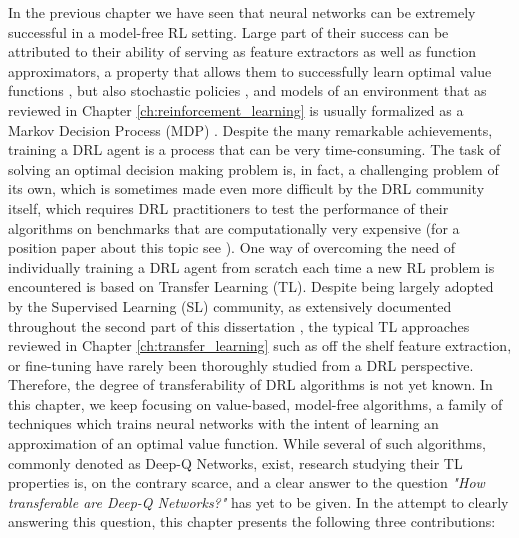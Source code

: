 In the previous chapter we have seen that neural networks can be extremely successful in a model-free RL setting. Large part of their success can be attributed to their ability of serving as feature extractors as well as function approximators, a property that allows them to successfully learn optimal value functions \citep{mnih2013playing,mnih2015human,van2016deep,zhao2016deep,wang2016dueling,sabatelli2020deep}, but also stochastic policies \citep{lillicrap2015continuous,schulman2015high,schulman2015trust,wang2016sample,mnih2016asynchronous,schulman2017proximal,haarnoja2018soft,fujimoto2018addressing}, and models of an environment \citep{ha2018world,kaiser2019model,hafner2019dream,hafner2019learning,hafner2020mastering} that as reviewed in Chapter \ref{ch:reinforcement_learning} is usually formalized as a Markov Decision Process (MDP) %
\cite{puterman1990markov}. Despite the many remarkable achievements, training a DRL agent is a process that can be very time-consuming. The task of solving an optimal decision making problem is,  in fact, a challenging problem of its own, which is sometimes made even more difficult by the DRL community itself, which requires DRL practitioners to test the performance of their algorithms on benchmarks that are computationally very expensive (for a position paper about this topic see \citep{obando2020revisiting}). One way of overcoming the need of individually training a DRL agent from scratch each time a new RL problem is encountered is based on Transfer Learning (TL). 
Despite being largely adopted by the Supervised Learning (SL) community, as extensively documented throughout the second part of this dissertation \citep{huh2016makes,mormont2018comparison,sabatelli2018deep,dominguez2019transfer,vandaele2021deep,ho2021evaluation}, the typical TL approaches reviewed in Chapter \ref{ch:transfer_learning} such as off the shelf feature extraction, or fine-tuning \citep{sharif2014cnn} have rarely been thoroughly studied from a DRL perspective. Therefore, the degree of transferability of DRL algorithms is not yet known. In this chapter, we keep focusing on value-based, model-free algorithms, a family of techniques which trains neural networks with the intent of learning an approximation of an optimal value function. While several of such algorithms, commonly denoted as Deep-Q Networks, exist, research studying their TL properties is, on the contrary scarce, and a clear answer to the question \textit{"How transferable are Deep-Q Networks?"} has yet to be given. In the attempt to clearly answering this question, this chapter presents the following three contributions:
